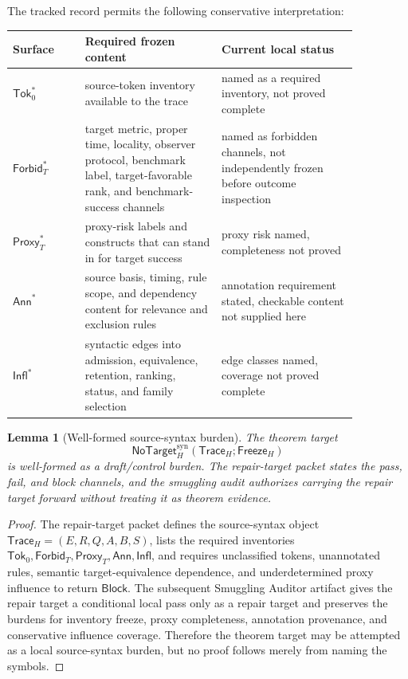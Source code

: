 \documentclass[11pt]{article}
\newcommand{\NoTargetSyn}{\mathsf{NoTarget}_{H}^{\mathrm{syn}}}
\newcommand{\SrcTok}{\mathsf{Tok}_{0}}
\newcommand{\ForbidT}{\mathsf{Forbid}_{T}}
\newcommand{\ProxyT}{\mathsf{Proxy}_{T}}
\newcommand{\TraceH}{\mathsf{Trace}_{H}}
\newcommand{\Annot}{\mathsf{Ann}}
\newcommand{\Influence}{\mathsf{Infl}}
\newcommand{\FreezeH}{\mathsf{Freeze}_{H}}
\newcommand{\Block}{\mathsf{Block}}
\newtheorem{lemma}{Lemma}
\begin{document}
The tracked record permits the following conservative interpretation:

\begin{center}
\begin{tabular}{p{0.18\linewidth}p{0.34\linewidth}p{0.34\linewidth}}
\textbf{Surface} & \textbf{Required frozen content} & \textbf{Current local status} \\
\hline
\(\SrcTok^{*}\) & source-token inventory available to the trace & named as a required inventory, not proved complete \\
\(\ForbidT^{*}\) & target metric, proper time, locality, observer protocol, benchmark label, target-favorable rank, and benchmark-success channels & named as forbidden channels, not independently frozen before outcome inspection \\
\(\ProxyT^{*}\) & proxy-risk labels and constructs that can stand in for target success & proxy risk named, completeness not proved \\
\(\Annot^{*}\) & source basis, timing, rule scope, and dependency content for relevance and exclusion rules & annotation requirement stated, checkable content not supplied here \\
\(\Influence^{*}\) & syntactic edges into admission, equivalence, retention, ranking, status, and family selection & edge classes named, coverage not proved complete \\
\end{tabular}
\end{center}

\begin{lemma}[Well-formed source-syntax burden]
The theorem target
\[
    \NoTargetSyn(\TraceH;\FreezeH)
\]
is well-formed as a draft/control burden. The repair-target packet states
the pass, fail, and block channels, and the smuggling audit authorizes
carrying the repair target forward without treating it as theorem evidence.
\end{lemma}

\begin{proof}
The repair-target packet defines the source-syntax object
\(\TraceH=(E,R,Q,A,B,S)\), lists the required inventories
\(\SrcTok,\ForbidT,\ProxyT,\Annot,\Influence\), and requires unclassified
tokens, unannotated rules, semantic target-equivalence dependence, and
underdetermined proxy influence to return \(\Block\). The subsequent
Smuggling Auditor artifact gives the repair target a conditional local pass
only as a repair target and preserves the burdens for inventory freeze,
proxy completeness, annotation provenance, and conservative influence
coverage. Therefore the theorem target may be attempted as a local
source-syntax burden, but no proof follows merely from naming the symbols.
\end{proof}
\end{document}
